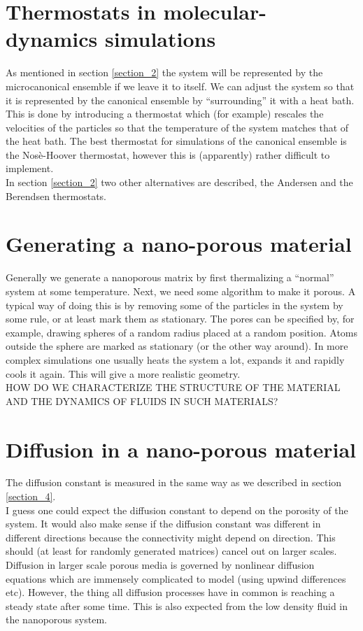 \documentclass[a4paper,english, 10pt, twoside]{article}
\begin{document}
\section{Thermostats in molecular-dynamics simulations}
As mentioned in section \ref{section_2} the system will be represented by the microcanonical ensemble if we leave it to 
itself. We can adjust the system so that it is represented by the canonical ensemble by ``surrounding'' it with 
a heat bath. This is done by introducing a thermostat which (for example) rescales the velocities of the particles 
so that the temperature of the system matches that of the heat bath. The best thermostat for simulations of the 
canonical ensemble is the Nosè-Hoover thermostat, however this is (apparently) rather difficult to implement.\\
In section \ref{section_2} two other alternatives are described, the Andersen and the Berendsen thermostats.

\section{Generating a nano-porous material}
Generally we generate a nanoporous matrix by first thermalizing a ``normal'' system at some temperature. 
Next, we need some algorithm to make it porous. A typical way of doing this is by removing some of the particles 
in the system by some rule, or at least mark them as stationary. The pores can be specified by, for example, 
drawing spheres of a random radius placed at a random position. Atoms outside the sphere are marked as stationary 
(or the other way around). In more complex simulations one usually heats the system a lot, expands it and rapidly cools 
it again. This will give a more realistic geometry.\\
HOW DO WE CHARACTERIZE THE STRUCTURE OF THE MATERIAL AND THE DYNAMICS OF FLUIDS IN SUCH MATERIALS?

\section{Diffusion in a nano-porous material}
The diffusion constant is measured in the same way as we described in section \ref{section_4}. \\
I guess one could expect the diffusion constant to depend on the porosity of the system. 
It would also make sense if the diffusion constant was different in different directions because the connectivity might depend on direction. This 
should (at least for randomly generated matrices) cancel out on larger scales. \\
Diffusion in larger scale porous media is governed by nonlinear diffusion equations which are immensely complicated 
to model (using upwind differences etc). However, the thing all diffusion processes have in common is reaching a steady 
state after some time. This is also expected from the low density fluid in the nanoporous system.
\end{document}
